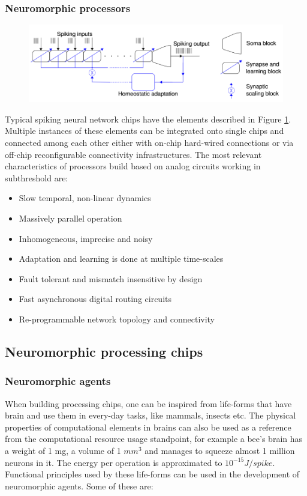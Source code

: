 \documentclass[main]{subfiles}
\begin{document}
\subsubsection{Neuromorphic processors}

%
\begin{figure}[h]
    \centering
    \includegraphics[width=0.8\linewidth]{12_NeuromorphicSystems2/figures/chips.PNG}
    \caption{}
    \label{fig:chip}
\end{figure}
%

Typical  spiking  neural  network chips have the elements described in Figure \ref{fig:chip}. Multiple instances of  these  elements  can  be  integrated  onto  single  chips  and connected  among  each  other  either  with  on-chip  hard-wired connections or via off-chip reconfigurable connectivity infrastructures. The most relevant characteristics of processors build based on analog circuits working in subthreshold are:

\begin{itemize}
    \item Slow temporal, non-linear dynamics
    \item Massively parallel operation
    \item Inhomogeneous, imprecise and noisy
    \item Adaptation and learning is done at multiple time-scales
    \item Fault tolerant and mismatch insensitive by design
    \item Fast asynchronous digital routing circuits
    \item Re-programmable network topology and connectivity
\end{itemize}

\subsection{Neuromorphic processing chips}

\subsubsection*{Neuromorphic agents}
When building processing chips, one can be inspired from life-forms that have brain and use them in every-day tasks, like mammals, insects etc. The physical properties of computational elements in brains can also be used as a reference from the computational resource usage standpoint, for example a bee's brain has a weight of 1 mg, a volume of 1 $mm^3$ and manages to squeeze almost 1 million neurons in it. The energy per operation is approximated to $10^{-15} J/spike$. Functional principles used by these life-forms can be used in the development of neuromorphic agents. Some of these are:
\end{document}
